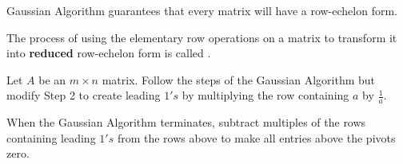 \documentclass{ximera}
\begin{document}
Gaussian Algorithm guarantees that every matrix will have a row-echelon form. 

\begin{definition}\label{def:GaussJordanElimination}
  The process of using the elementary row operations on a matrix to transform it into {\bf reduced} row-echelon form is called .
  \end{definition}

  \begin{algorithm} \label{alg:gauss-jordan}
    Let $A$ be an $m\times n$ matrix.
    Follow the steps of the Gaussian Algorithm but modify Step 2 to create leading $1's$ by multiplying the row containing $a$ by $\frac{1}{a}$.
     
     
     
     
     
    When the Gaussian Algorithm terminates, subtract multiples of the rows containing leading $1's$ from the rows above to make all entries above the pivots zero.
    \end{algorithm}
\end{document}
